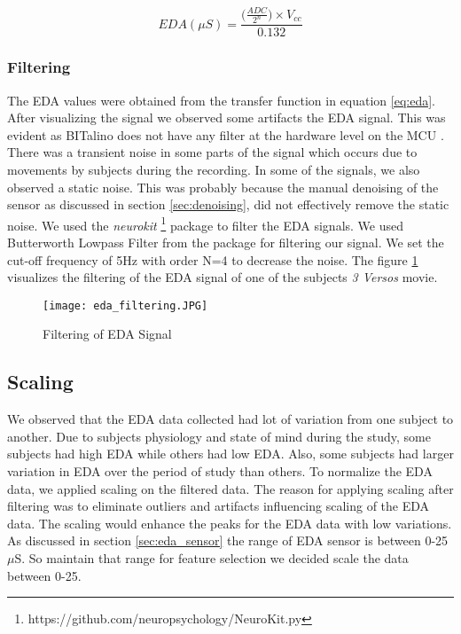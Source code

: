 \begin{equation}
\label{eq:eda}
    EDA(\mu S) = \frac{\big(\frac{ADC}{2^n}) \times V_{cc}}{0.132}
\end{equation}

\subsubsection{Filtering} The EDA values were obtained from the transfer function in equation \ref{eq:eda}. After visualizing the signal we observed some artifacts the EDA signal. This was evident as BITalino does not have any filter at the hardware level on the MCU \cite{noauthor_faq_nodate}. There was a transient noise in some parts of the signal which occurs due to movements by subjects during the recording. In some of the signals, we also observed a static noise. This was probably because the manual denoising of the sensor as discussed in section \ref{sec:denoising}, did not effectively remove the static noise. We used the \textit{neurokit} \footnote{https://github.com/neuropsychology/NeuroKit.py} package to filter the EDA signals. We used Butterworth Lowpass Filter from the package for filtering our signal. We set the cut-off frequency of 5Hz with order N=4 to decrease the noise. The figure \ref{fig:eda_filtering_} visualizes the filtering of the EDA signal of one of the subjects \textit{3 Versos} movie.

\begin{figure}
    \centering
    \texttt{[image: eda\_filtering.JPG]}
    \caption{Filtering of EDA Signal}
    \label{fig:eda_filtering_}
\end{figure}

\subsection{Scaling}
\label{sec:eda_scaling}
We observed that the EDA data collected had lot of variation from one subject to another. Due to subjects physiology and state of mind during the study, some subjects had high EDA while others had low EDA. Also, some subjects had larger variation in EDA over the period of study than others. To normalize the EDA data, we applied scaling on the filtered data. The reason for applying scaling after filtering was to eliminate outliers and artifacts influencing scaling of the EDA data. The scaling would enhance the peaks for the EDA data with low variations. As discussed in section \ref{sec:eda_sensor} the range of EDA sensor is between 0-25$\mu$S. So maintain that range for feature selection we decided scale the data between 0-25.
